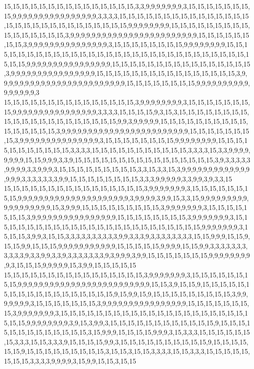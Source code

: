 15,15,15,15,15,15,15,15,15,15,15,15,15,15,15,3,3,9,9,9,9,9,9,9,3,15,15,15,15,15,15,15,15,9,9,9,9,9,9,9,9,9,9,9,9,9,9,9,9,3,3,3,3,15,15,15,15,15,15,15,15,15,15,15,15,15,15,15,15,15,15,15,15,15,15,15,15,15,15,15,15,15,9,9,9,9,9,9,9,9,15,15,15,15,15,15,15,15,15,15,15,15,15,15,15,15,3,9,9,9,9,9,9,9,9,9,9,9,9,9,9,9,9,9,9,9,9,9,9,9,9,15,15,15,15,15,15,15,15,3,9,9,9,9,9,9,9,9,9,9,9,9,9,9,9,3,15,15,15,15,15,15,15,15,9,9,9,9,9,9,9,9,15,15,15,15,15,15,15,15,15,15,15,15,15,15,15,15,15,15,15,15,15,15,15,15,15,15,15,15,15,15,15,15,15,9,9,9,9,9,9,9,9,9,9,9,9,9,9,9,9,15,15,15,15,15,15,15,15,15,15,15,15,15,15,15,15,3,9,9,9,9,9,9,9,9,9,9,9,9,9,9,9,9,15,15,15,15,15,15,15,15,15,15,15,15,15,15,15,15,3,9,9,9,9,9,9,9,9,9,9,9,9,9,9,9,9,9,9,9,9,9,9,9,9,15,15,15,15,15,15,15,15,9,9,9,9,9,9,9,9,9,9,9,9,9,9,9,9,3
15,15,15,15,15,15,15,15,15,15,15,15,15,15,15,3,9,9,9,9,9,9,9,9,3,15,15,15,15,15,15,15,15,9,9,9,9,9,9,9,9,9,9,9,9,9,9,9,9,3,3,3,3,15,15,15,15,9,3,15,3,15,15,15,15,15,15,15,15,15,15,15,15,15,15,15,15,15,15,15,15,15,9,9,3,9,9,9,9,9,15,15,15,15,15,15,15,15,15,15,15,15,15,15,15,15,3,9,9,9,9,9,9,9,9,9,9,9,9,9,9,9,9,9,9,9,9,9,9,9,9,15,15,15,15,15,15,15,15,3,9,9,9,9,9,9,9,9,9,9,9,9,9,9,9,3,15,15,15,15,15,15,15,15,9,9,9,9,9,9,9,9,15,15,15,15,15,15,15,15,15,15,15,3,3,3,3,15,15,15,15,15,15,15,15,15,15,15,3,3,3,3,15,3,3,9,9,9,9,9,9,9,9,15,15,9,9,9,3,3,9,15,15,15,15,15,15,15,15,15,15,15,15,15,15,15,15,3,9,3,3,3,3,3,9,9,9,9,3,3,9,9,9,3,15,15,15,15,15,15,15,15,15,3,3,15,3,3,15,3,9,9,9,9,9,9,9,9,9,9,9,9,9,9,9,9,3,3,3,3,3,3,3,9,9,15,15,15,15,15,15,15,15,3,3,3,9,9,9,9,9,3,3,9,9,3,9,3,3,15
15,15,15,15,15,15,15,15,15,15,15,15,15,15,15,15,3,9,9,9,9,9,9,9,3,15,15,15,15,15,15,15,15,9,9,9,9,9,9,9,9,9,9,9,9,9,9,9,9,9,9,9,9,9,3,9,9,9,9,3,9,9,15,3,3,15,9,9,9,9,9,9,9,9,9,9,9,9,9,9,9,9,9,9,15,3,9,9,9,15,15,15,15,15,15,15,15,15,3,9,9,9,9,9,9,9,3,15,15,15,15,15,15,15,3,9,9,9,9,9,9,9,9,9,9,9,9,9,9,9,9,15,15,15,15,15,15,15,15,3,9,9,9,9,9,9,9,3,15,15,15,15,15,15,15,15,15,15,15,15,15,15,15,15,15,15,15,15,15,15,15,15,9,9,9,9,9,9,9,3,15,15,15,3,9,9,3,15,15,3,3,3,3,3,3,3,3,3,3,9,9,3,3,3,9,3,3,3,3,3,3,3,3,15,15,9,9,9,15,15,9,15,15,9,9,15,15,15,9,9,9,9,9,9,9,9,9,9,9,15,15,15,15,15,9,9,9,9,15,15,9,9,3,3,3,3,3,3,3,3,3,3,3,9,3,3,9,9,3,3,9,3,3,3,3,3,3,3,9,3,9,9,9,3,9,9,15,15,15,15,15,15,15,9,9,9,9,9,9,9,9,9,3,15,15,15,9,9,9,9,9,15,3,9,9,15,15,15,15,15
15,15,15,15,15,15,15,15,15,15,15,15,15,15,15,15,3,9,9,9,9,9,9,9,3,15,15,15,15,15,15,15,15,9,9,9,9,9,9,9,9,9,9,9,9,9,9,9,9,9,9,9,9,9,9,9,9,9,15,15,3,9,15,15,9,15,15,15,15,15,15,15,15,15,15,15,15,15,15,15,15,15,15,9,15,9,9,15,9,15,15,15,15,15,15,15,15,15,3,9,9,9,9,9,9,9,3,15,15,15,15,15,15,15,3,9,9,9,9,9,9,9,9,9,9,9,9,9,9,9,9,15,15,15,15,15,15,15,15,3,9,9,9,9,9,9,9,3,15,15,15,15,15,15,15,15,15,15,15,15,15,15,15,15,15,15,15,15,15,15,15,15,9,9,9,9,9,9,9,9,3,9,15,3,9,9,3,15,15,15,15,15,15,15,15,15,15,15,15,9,15,15,15,15,15,15,15,15,15,15,15,15,15,3,15,9,9,9,15,15,15,15,9,9,9,3,15,3,3,3,15,15,15,15,15,15,15,3,3,3,15,15,3,3,3,9,15,15,15,15,9,9,3,15,15,15,15,15,15,15,15,15,15,9,15,15,15,15,15,15,9,15,15,15,15,15,15,15,15,15,3,15,15,3,15,15,3,3,3,3,15,15,3,3,3,15,15,15,15,15,15,15,15,3,3,3,3,9,9,9,9,3,15,9,9,15,15,3,15,15
